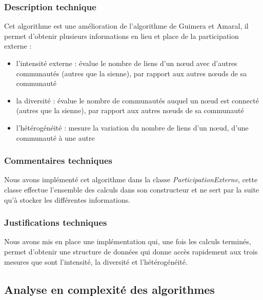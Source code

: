 \begin{titlepage}
{\subsubsection{Description technique}
{
Cet algorithme est une amélioration de l'algorithme de Guimera et Amaral, il permet d'obtenir plusieurs informations en lieu et place de la participation externe :
}
\begin{itemize}
    \item l'intensité externe : évalue le nombre de liens d'un nœud avec d'autres communautés (autres que la sienne), par rapport aux autres nœuds de sa communauté
    \item la diversité : évalue le nombre de communautés auquel un nœud est connecté (autres que la sienne), par rapport aux autres nœuds de sa communauté
    \item l'hétérogénéité : mesure la variation du nombre de liens d'un nœud, d'une communauté à une autre
\end{itemize}
\subsubsection{Commentaires techniques}
{
Nous avons implémenté cet algorithme dans la classe \textit{ParticipationExterne}, cette classe effectue l'ensemble des calculs dans son constructeur et ne sert par la suite qu'à stocker les différentes informations.
}
\subsubsection{Justifications techniques}
{
Nous avons mis en place une implémentation qui, une fois les calculs terminés, permet d'obtenir une structure de données qui donne accès rapidement aux trois mesures que sont l'intensité, la diversité et l'hétérogénéité.}
}


\newpage
\begin{center}
\begin{bf}
\section{Analyse en complexité des algorithmes}
\end{bf}
\end{center}


\end{titlepage}

